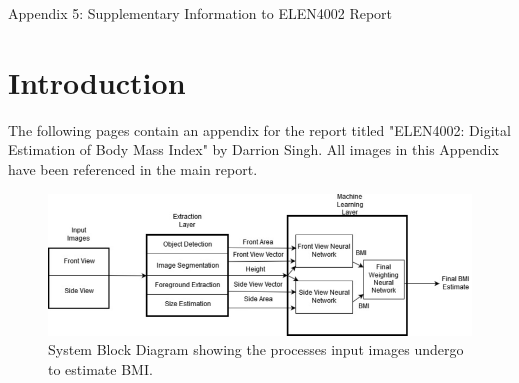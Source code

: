 \documentclass[conference]{IEEEtran}
\begin{document}
\onecolumn
\begin{center}
\LARGE Appendix 5: Supplementary Information to ELEN4002 Report
\end{center}
\section{Introduction}
The following pages contain an appendix for the report titled "ELEN4002: Digital Estimation of Body Mass Index" by Darrion Singh.
All images in this Appendix have been referenced in the main report.
\begin{figure}[h]
    \centering
    \includegraphics[width=\linewidth]{systemblock.png}
    \caption{System Block Diagram showing the processes input images undergo to estimate BMI.}
    \label{fig:systemblockdiagram}
\end{figure}
\end{document}
